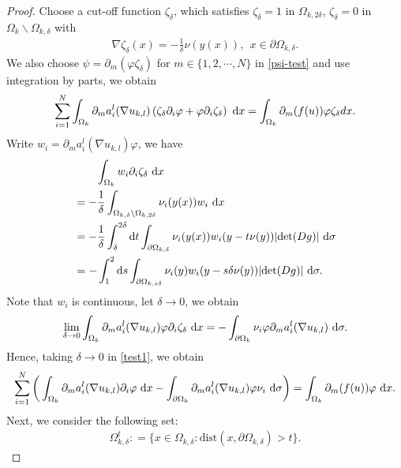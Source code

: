 \documentclass[reqno, 11pt]{amsart} %
\numberwithin{equation}{section}
\theoremstyle{definition}
\newcommand{\pa}{\partial}
\newcommand{\dx}{\textup{d}x}
\begin{document}
\begin{proof}
    Choose a cut-off function $\zeta_{\delta}$, which satisfies $ \zeta_{\delta} = 1$ in $\Omega_{k, 2\delta}$, $\zeta_{\delta} = 0$ in $\Omega_k \backslash \Omega_{k, \delta}$ with
    \begin{align*}
        \nabla \zeta_{\delta}(x) = - \frac{1}{\delta} \nu(y(x)), \ \ x \in \pa \Omega_{k, \delta}.
    \end{align*}
   We also choose $\psi  = \pa_m (\varphi \zeta_{\delta})$ for $m \in \{1,2,\cdots,N\}$ in \eqref{psi-test} and use integration by parts, we obtain
    \begin{align}\label{test1}
        \sum\limits_{i=1}^N \int_{\Omega_k} \pa_m a_i^l(\nabla u_{k,l}) \left( \zeta_{\delta}\pa_i \varphi + \varphi \pa_i \zeta_{\delta}\right) \ \dx = \int_{\Omega_k} \pa_m (f(u)) \varphi \zeta_{\delta}dx.
    \end{align}
    Write $w_i = \pa_m a_i^l(\nabla u_{k,l}) \varphi$, we have
    \begin{align*}
        &\qquad\int_{\Omega_k} w_i \pa_i \zeta_{\delta} \ \dx\\
         & = - \frac{1}{\delta}\int_{\Omega_{k, \delta} \backslash \Omega_{k, 2\delta}} \nu_i(y(x)) w_i \ \text{d}x \\
        & = - \frac{1}{\delta} \int_{\delta}^{2\delta} \text{d}t \int_{\pa \Omega_{k, \delta}} \nu_i(y(x)) w_i(y - t\nu(y)) |\text{det} (Dg)| \ \text{d} \sigma \\
        & = - \int_{1}^2 \text{d}s \int_{\pa \Omega_{k, s\delta}} \nu_i(y) w_i(y - s \delta\nu(y)) |\text{det} (Dg)| \ \text{d} \sigma .
    \end{align*}
    Note that $w_i$ is continuous, let $\delta \to 0$, we  obtain
    \begin{align*}
        \lim\limits_{\delta \to 0} \int_{\Omega_k} \pa_m a_i^l(\nabla u_{k,l}) \varphi \pa_i \zeta_{\delta} \ \dx = -\int_{\pa \Omega_k} \nu_i\varphi  \pa_m a_i^l(\nabla u_{k,l})  \ \text{d} \sigma.
    \end{align*}
    Hence, taking $\delta \to 0$ in \eqref{test1}, we obtain
    \begin{align}\label{test2}
        \sum\limits_{i=1}^N \bigg( \int_{\Omega_k}\pa_m a_i^l(\nabla u_{k,l}) \pa_i \varphi \ \dx - \int_{\pa \Omega_k} \pa_m a_i^l(\nabla u_{k,l})\varphi \nu_i \ \text{d} \sigma\bigg)  
         = \int_{\Omega_k} \pa_m (f(u)) \varphi \ \dx. 
    \end{align}
    Next, we consider the following set:
    \begin{align*}
        \Omega_{k,\delta}^{t} : = \{x \in \Omega_{k,\delta}: \text{dist}(x,\pa \Omega_{k,\delta}) > t\}.

\end{align*}
\end{proof}
\end{document}
